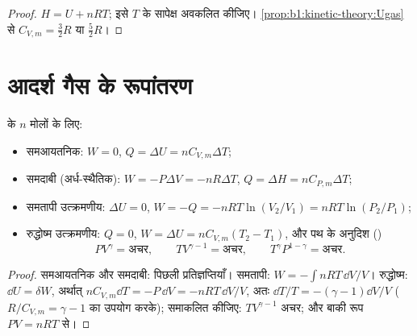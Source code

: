\begin{proof}
$H = U + nRT$; इसे $T$ के सापेक्ष अवकलित कीजिए।
\cref{prop:b1:kinetic-theory:Ugas} से $C_{V,m} = \tfrac32 R$ या $\tfrac52 R$।
\end{proof}

\section{आदर्श गैस के रूपांतरण}

\begin{proposition}[चार मानक रूपांतरण]\label{prop:b1:first-law:transformations}
 के $n$ मोलों के लिए:
\begin{itemize}
  \item समआयतनिक: $W = 0$, $Q = \Delta U = nC_{V,m}\Delta T$;
  \item समदाबी (अर्ध-स्थैतिक): $W = -P\Delta V = -nR\Delta T$, $Q = \Delta H =
        nC_{P,m}\Delta T$;
  \item समतापी उत्क्रमणीय: $\Delta U = 0$, $W = -Q = -nRT\ln(V_2/V_1) =
        nRT\ln(P_2/P_1)$;
  \item रुद्धोष्म उत्क्रमणीय: $Q = 0$, $W = \Delta U = nC_{V,m}(T_2 - T_1)$,
        और पथ के अनुदिश (\emph{})
        \[
        PV^\gamma = \text{अचर}, \qquad TV^{\gamma - 1} = \text{अचर}, \qquad
        T^\gamma P^{1 - \gamma} = \text{अचर} .
        \]
\end{itemize}
\end{proposition}

\begin{proof}
समआयतनिक और समदाबी: पिछली प्रतिज्ञप्तियाँ। समतापी: $W =
-\int nRT\,\dd V/V$। रुद्धोष्म: $\dd U = \delta W$, अर्थात् $nC_{V,m}\dd T =
-P\,\dd V = -nRT\,\dd V/V$, अतः $\dd T/T = -(\gamma - 1)\dd V/V$
($R/C_{V,m} = \gamma - 1$ का उपयोग करके); समाकलित कीजिए: $TV^{\gamma - 1}$
अचर; और बाकी रूप $PV = nRT$ से।
\end{proof}

